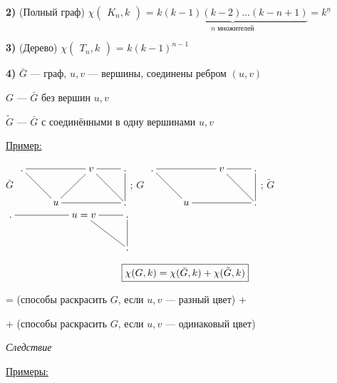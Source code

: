\documentclass[a4paper, 12pt] {article}
\begin{document}
\textbf{2)} (Полный граф) $ \chi \begin{pmatrix}
	K_{n}, k
\end{pmatrix}$ = $ \underbrace{k(k-1)(k-2)\dots(k-n+1)}_{n \text{ множителей}}=k^{\underline{n}}$

\textbf{3)} (Дерево)
$ \chi \begin{pmatrix}
	T_{n}, k
\end{pmatrix}$ = $ k(k-1)^{n-1}$

\textbf{4)} $ \bar G $ --- граф, $ u, v $ --- вершины, соединены ребром $ (u, v) $

$ G $ ---  $ \bar G $ без вершин $ u, v $

$ \tilde G $ --- $ \bar G $ с соединёнными в одну вершинами $ u, v $

\underline{Пример:}

$ \bar G $
$\begin{matrix}
	\xymatrix{
		. \ar@{-}[rr] \ar@{-}[rd] & & v \ar@{-}[ld] \ar@{-}[rd] \ar@{-}[r] & . \ar@{-}[d]\\
		& u \ar@{-}[rr]& & .\\
	}
\end{matrix}$;
$ G $
$\begin{matrix}
	\xymatrix{
		. \ar@{-}[rr] \ar@{-}[rd] & & v  \ar@{-}[rd] \ar@{-}[r] & . \ar@{-}[d]\\
		& u \ar@{-}[rr]& & .\\
	}
\end{matrix}$;
$ \tilde G $
$\begin{matrix}
	\xymatrix{
		. \ar@{-}[rr] & & u=v  \ar@{-}[rd] \ar@{-}[r] & . \ar@{-}[d]\\
		& & & .\\
	}
\end{matrix}$\\
\begin{center}
	 \begin{equation}\label{eq3}
	\fbox{$\chi (G, k)= \chi (\bar G, k) + \chi (\tilde G, k)$}
\end{equation}
\end{center}
= (способы раскрасить $ G $, если $ u, v $ --- разный цвет) +

+ (способы раскрасить $ G $, если $ u, v $ --- одинаковый цвет)

\textit{Следствие}
\begin{center}
\end{center}

\underline{Примеры:}
\end{document}
